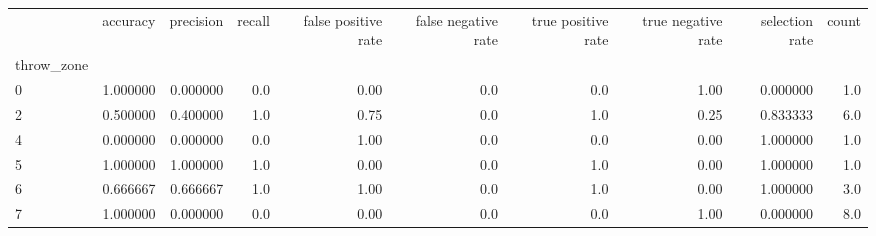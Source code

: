 \begin{tabular}{lrrrrrrrrr}
\toprule
{} &  accuracy &  precision &  recall &  false positive rate &  false negative rate &  true positive rate &  true negative rate &  selection rate &  count \\
throw\_zone &           &            &         &                      &                      &                     &                     &                 &        \\
\midrule
0          &  1.000000 &   0.000000 &     0.0 &                 0.00 &                  0.0 &                 0.0 &                1.00 &        0.000000 &    1.0 \\
2          &  0.500000 &   0.400000 &     1.0 &                 0.75 &                  0.0 &                 1.0 &                0.25 &        0.833333 &    6.0 \\
4          &  0.000000 &   0.000000 &     0.0 &                 1.00 &                  0.0 &                 0.0 &                0.00 &        1.000000 &    1.0 \\
5          &  1.000000 &   1.000000 &     1.0 &                 0.00 &                  0.0 &                 1.0 &                0.00 &        1.000000 &    1.0 \\
6          &  0.666667 &   0.666667 &     1.0 &                 1.00 &                  0.0 &                 1.0 &                0.00 &        1.000000 &    3.0 \\
7          &  1.000000 &   0.000000 &     0.0 &                 0.00 &                  0.0 &                 0.0 &                1.00 &        0.000000 &    8.0 \\
\bottomrule
\end{tabular}
